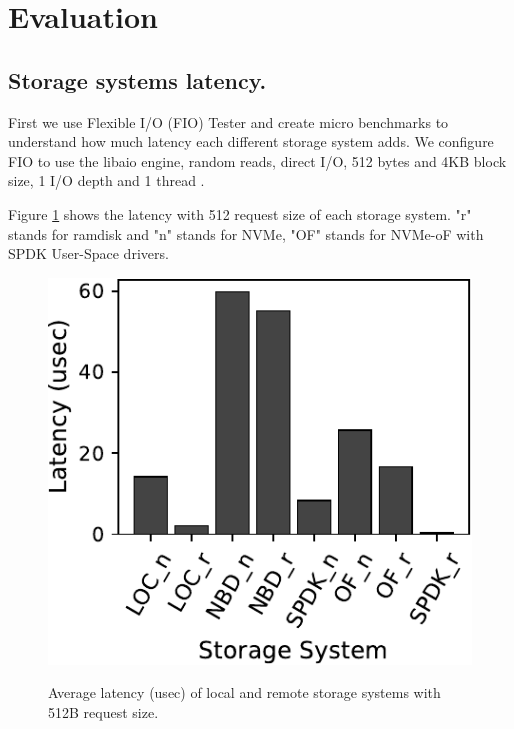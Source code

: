 \section{Evaluation}
\subsection{Storage systems latency.}
First we use Flexible I/O (FIO) Tester and  create micro benchmarks to understand
how much latency each different storage system adds.  We configure FIO to use the
libaio engine, random reads, direct I/O, 512 bytes and 4KB block size, 1 I/O
depth and 1 thread .

Figure \ref{fig:fio_512} shows the latency with 512  request size
of each storage system.  "r" stands for ramdisk and "n" stands for NVMe, "OF"
stands for NVMe-oF with SPDK User-Space drivers.

\begin{figure}[H]
  \includegraphics[width=\linewidth]{figures/fio_512.pdf}\\
\caption{Average latency (usec) of local and remote storage systems with
 512B request size.}
\label{fig:fio_512}
\end{figure}

